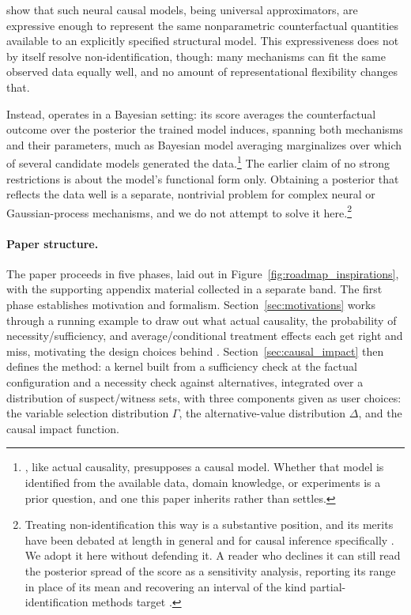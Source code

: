 \citet{xia2022neural} show that such neural causal models, being universal
approximators, are expressive enough to represent the same nonparametric
counterfactual quantities available to an explicitly specified structural
model. This expressiveness does not by itself resolve non-identification,
though: many mechanisms can fit the same observed data equally well, and no
amount of representational flexibility changes that.

Instead, \ourapproach operates in a Bayesian setting: its score averages the
counterfactual outcome over the posterior the trained model induces, spanning both
mechanisms and their parameters, much as Bayesian model averaging marginalizes over
which of several candidate models generated the data.\footnote{\ourapproach, like
actual causality, presupposes a causal model. Whether that model is identified from the
available data, domain knowledge, or experiments is a prior question, and one this
paper inherits rather than settles.} The earlier claim of no strong restrictions is
about the model's functional form only. Obtaining a posterior that reflects the data
well is a separate, nontrivial problem for complex neural or Gaussian-process
mechanisms, and we do not attempt to solve it here.\footnote{Treating non-identification this way is a substantive position,
and its merits have been debated at length in general \citep{poirier1998revising,
gustafson2015partial, moon2012bayesian} and for causal inference specifically
\citep{rubin1978bayesian, richardson2011transparent}. We adopt it here without
defending it. A reader who declines it can still read the posterior spread of the score
as a sensitivity analysis, reporting its range in place of its mean and recovering an
interval of the kind partial-identification methods target \citep{manski2003partial,
zhang2022partial}.}

\paragraph{Paper structure.}
The paper proceeds in five phases, laid out in Figure~\ref{fig:roadmap_inspirations},
with the supporting appendix material collected in a separate band.
The first phase establishes motivation and formalism.
Section~\ref{sec:motivations} works through a running example
to draw out what actual causality, the probability of necessity/sufficiency,
and average/conditional treatment effects each get right and miss, motivating
the design choices behind \ourapproach.
Section~\ref{sec:causal_impact} then defines the method: a kernel built from a
sufficiency check at the factual configuration and a necessity check against
alternatives, integrated over a distribution of suspect/witness sets, with
three components given as user choices: the variable selection distribution
$\Gamma$, the alternative-value distribution $\Delta$, and the causal impact
function.

